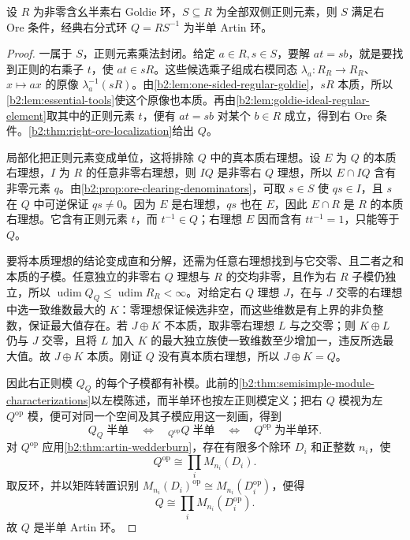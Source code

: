 \begin{theorem}\label{b2:thm:goldie-sufficiency}
	设 \(R\) 为非零含幺半素右 Goldie 环，\(S\subseteq R\) 为全部双侧正则元素，则 \(S\) 满足右 Ore 条件，经典右分式环 \(Q=RS^{-1}\) 为半单 Artin 环。
\end{theorem}
\begin{proof}
	一属于 \(S\)，正则元素乘法封闭。给定 \(a\in R,s\in S\)，要解 \(at=sb\)，就是要找到正则的右乘子 \(t\)，使 \(at\in sR\)。这些候选乘子组成右模同态 \(\lambda_a:R_R\rightarrow R_R\)、\(x\mapsto ax\) 的原像 \(\lambda_a^{-1}(sR)\)。由\cref{b2:lem:one-sided-regular-goldie}，\(sR\) 本质，所以\cref{b2:lem:essential-tools}使这个原像也本质。再由\cref{b2:lem:goldie-ideal-regular-element}取其中的正则元素 \(t\)，便有 \(at=sb\) 对某个 \(b\in R\) 成立，得到右 Ore 条件。\cref{b2:thm:right-ore-localization}给出 \(Q\)。

	局部化把正则元素变成单位，这将排除 \(Q\) 中的真本质右理想。设 \(E\) 为 \(Q\) 的本质右理想，\(I\) 为 \(R\) 的任意非零右理想，则 \(IQ\) 是非零右 \(Q\) 理想，所以 \(E\cap IQ\) 含有非零元素 \(q\)。由\cref{b2:prop:ore-clearing-denominators}，可取 \(s\in S\) 使 \(qs\in I\)，且 \(s\) 在 \(Q\) 中可逆保证 \(qs\ne0\)。因为 \(E\) 是右理想，\(qs\) 也在 \(E\)，因此 \(E\cap R\) 是 \(R\) 的本质右理想。它含有正则元素 \(t\)，而 \(t^{-1}\in Q\)；右理想 \(E\) 因而含有 \(tt^{-1}=1\)，只能等于 \(Q\)。

	要将本质理想的结论变成直和分解，还需为任意右理想找到与它交零、且二者之和本质的子模。任意独立的非零右 \(Q\) 理想与 \(R\) 的交均非零，且作为右 \(R\) 子模仍独立，所以 \(\operatorname{udim}Q_Q\le\operatorname{udim}R_R<\infty\)。对给定右 \(Q\) 理想 \(J\)，在与 \(J\) 交零的右理想中选一致维数最大的 \(K\)：零理想保证候选非空，而这些维数是有上界的非负整数，保证最大值存在。若 \(J\oplus K\) 不本质，取非零右理想 \(L\) 与之交零；则 \(K\oplus L\) 仍与 \(J\) 交零，且将 \(L\) 加入 \(K\) 的最大独立族使一致维数至少增加一，违反所选最大值。故 \(J\oplus K\) 本质。刚证 \(Q\) 没有真本质右理想，所以 \(J\oplus K=Q\)。

	因此右正则模 \(Q_Q\) 的每个子模都有补模。此前的\cref{b2:thm:semisimple-module-characterizations}以左模陈述，而半单环也按左正则模定义；把右 \(Q\) 模视为左 \(Q^{\mathrm{op}}\) 模，便可对同一个空间及其子模应用这一刻画，得到
	\[
		Q_Q\;\text{半单} \quad\Longleftrightarrow\quad {}_{Q^{\mathrm{op}}}Q\;\text{半单} \quad\Longleftrightarrow\quad Q^{\mathrm{op}}\;\text{为半单环}.
	\]
	对 \(Q^{\mathrm{op}}\) 应用\cref{b2:thm:artin-wedderburn}，存在有限多个除环 \(D_i\) 和正整数 \(n_i\)，使
	\[
		Q^{\mathrm{op}}\cong\prod_i M_{n_i}(D_i).
	\]
	取反环，并以矩阵转置识别 \(M_{n_i}(D_i)^{\mathrm{op}}\cong M_{n_i}(D_i^{\mathrm{op}})\)，便得
	\[
		Q\cong\prod_i M_{n_i}(D_i^{\mathrm{op}}).
	\]
	故 \(Q\) 是半单 Artin 环。
\end{proof}

